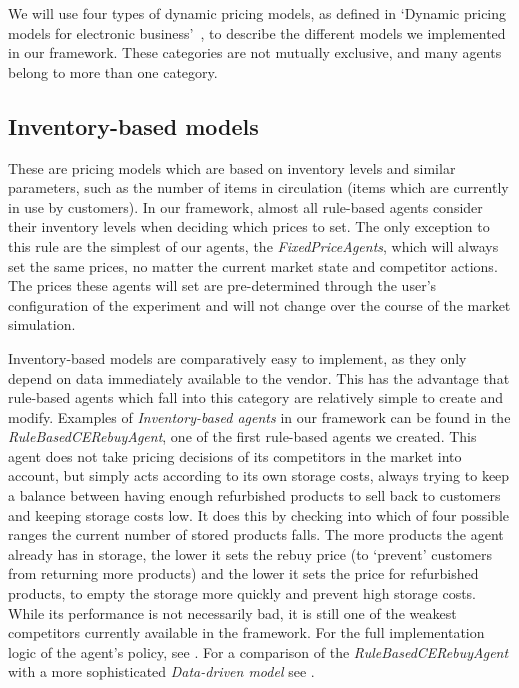 We will use four types of dynamic pricing models, as defined in `Dynamic pricing models for electronic business'~\cite{dynamicPricingModels}, to describe the different models we implemented in our framework. These categories are not mutually exclusive, and many agents belong to more than one category.

\subsection{Inventory-based models}\label{subsec:InventoryBasedModels}

These are pricing models which are based on inventory levels and similar parameters, such as the number of items in circulation (items which are currently in use by customers). In our framework, almost all rule-based agents consider their inventory levels when deciding which prices to set. The only exception to this rule are the simplest of our agents, the \emph{FixedPriceAgents}, which will always set the same prices, no matter the current market state and competitor actions. The prices these agents will set are pre-determined through the user's configuration of the experiment and will not change over the course of the market simulation.

Inventory-based models are comparatively easy to implement, as they only depend on data immediately available to the vendor. This has the advantage that rule-based agents which fall into this category are relatively simple to create and modify. Examples of \emph{Inventory-based agents} in our framework can be found in the \emph{RuleBasedCERebuyAgent}, one of the first rule-based agents we created. This agent does not take pricing decisions of its competitors in the market into account, but simply acts according to its own storage costs, always trying to keep a balance between having enough refurbished products to sell back to customers and keeping storage costs low. It does this by checking into which of four possible ranges the current number of stored products falls. The more products the agent already has in storage, the lower it sets the rebuy price (to `prevent' customers from returning more products) and the lower it sets the price for refurbished products, to empty the storage more quickly and prevent high storage costs. While its performance is not necessarily bad, it is still one of the weakest competitors currently available in the framework. For the full implementation logic of the agent's policy, see . For a comparison of the \emph{RuleBasedCERebuyAgent} with a more sophisticated \emph{Data-driven model} see .

